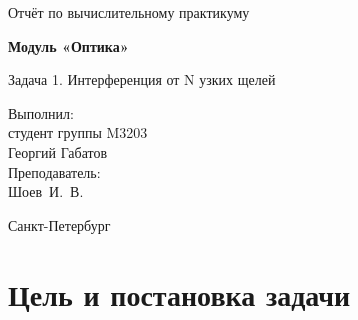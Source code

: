 \documentclass[12pt,a4paper]{article}
\begin{document}
\begin{titlepage}
  \centering
  \vspace*{1.5cm}

  {\Large Отчёт по вычислительному практикуму\par}
  \vspace{2.5cm}

  {\LARGE\bfseries Модуль «Оптика»\par}
  \vspace{1cm}

  {\Large Задача 1. Интерференция от N узких щелей\par}

  \vfill

  \begin{flushright}
    \begin{minipage}{0.55\textwidth}
      \raggedleft
      Выполнил:\\
      студент группы M3203\\
      Георгий Габатов\\[12pt]
      Преподаватель:\\
      Шоев~И.~В.
    \end{minipage}
  \end{flushright}

  \vspace{2cm}

  {\large Санкт-Петербург\\[6pt]
  \the\year\par}

\end{titlepage}

\begin{abstract}
\noindent
Построена компьютерная модель интерференции и дифракции света на решётке
из \(N\) (\(1\le N\le10\)) параллельных узких щелей в режиме Фраунгофера.
Реализованы монохроматический и квазимонохроматический режимы освещения,
интерактивная визуализация \(I(y)\) и цветного распределения на экране.
Проверка по формуле \(\Delta y=L\lambda/d\) даёт погрешность 0.2\%.
Показано сужение главных максимумов при увеличении \(N\).
\end{abstract}

\tableofcontents
\newpage

\section{Цель и постановка задачи}
\end{document}
